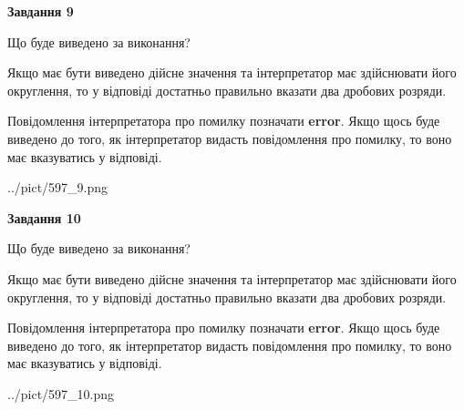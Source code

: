 \documentclass[12pt, ukrainian]{article}
\begin{document}
{\begin {Large}
{\begin {center}\textbf{Завдання 9}\end {center}}\par
Що буде виведено за виконання? \par

Якщо має бути виведено дійсне значення та інтерпретатор має здійснювати його округлення, 
то у відповіді достатньо правильно вказати два дробових розряди.

Повідомлення інтерпретатора про помилку позначати \textbf{error}.
Якщо щось буде виведено до того, як інтерпретатор видасть повідомлення про помилку, 
то воно має вказуватись у відповіді. \par

\begin{center}
	{../pict/597_9.png}
\end{center}
\newpage

{\begin {center}\textbf{Завдання 10}\end {center}}\par
Що буде виведено за виконання? \par

Якщо має бути виведено дійсне значення та інтерпретатор має здійснювати його округлення, 
то у відповіді достатньо правильно вказати два дробових розряди.

Повідомлення інтерпретатора про помилку позначати \textbf{error}.
Якщо щось буде виведено до того, як інтерпретатор видасть повідомлення про помилку, 
то воно має вказуватись у відповіді. \par

\begin{center}
	{../pict/597_10.png}
\end{center}
\newpage

\end {Large}}
\end{document}
